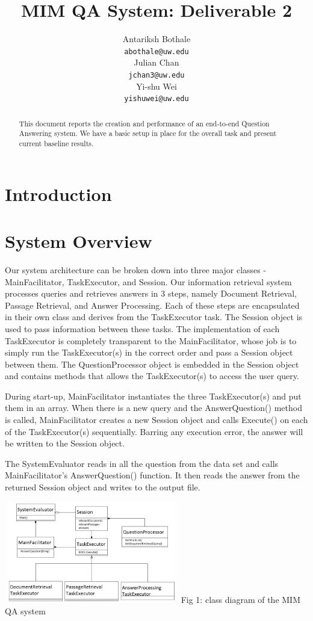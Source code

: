 \documentclass[11pt]{article}
\title{MIM QA System: Deliverable 2}
\author{Antariksh Bothale \\
  {\tt abothale@uw.edu} \\\And
  Julian Chan\\
  {\tt jchan3@uw.edu} \\\And
  Yi-shu Wei\\
  {\tt yishuwei@uw.edu}}
\date{}
\begin{document}
\maketitle
\begin{abstract}
This document reports the creation and performance of an end-to-end Question Answering system. We have a basic setup in place for the overall task and present current baseline results.
\end{abstract}

\section{Introduction}


\section{System Overview}

Our system architecture can be broken down into three major classes - MainFacilitator, TaskExecutor, and Session. Our information retrieval system processes queries and retrieves answers in 3 steps, namely Document Retrieval, Passage Retrieval, and Answer Processing. Each of these steps are encapsulated in their own class and derives from the TaskExecutor task.  The Session object is used to pass information between these tasks. The implementation of each TaskExecutor is completely transparent to the MainFacilitator, whose job is to simply run the TaskExecutor(s) in the correct order and pass a Session object between them. The QuestionProcessor object is embedded in the Session object and contains methods that allows the TaskExecutor(s) to access the user query.

During start-up, MainFacilitator instantiates the three TaskExecutor(s) and put them in an array. When there is a new query and the AnswerQuestion() method is called, MainFacilitator creates a new Session object and calls Execute() on each of the TaskExecutor(s) sequentially. Barring any execution error, the answer will be written to the Session object. 

The SystemEvaluator reads in all the question from the data set and calls MainFacilitator's AnswerQuestion() function. It then reads the answer from the returned Session object and 
writes to the output file.

\includegraphics[width=3in,height=1.75in]{MIM_class_diagram.png}
Fig 1: class diagram of the MIM QA system
\end{document}
